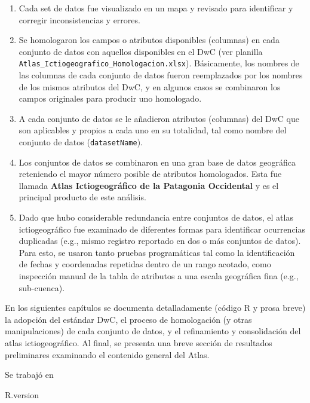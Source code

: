 \documentclass[sn-apa,pdflatex]{sn-jnl}
\newenvironment{Shaded}{\begin{snugshade}}{\end{snugshade}}
\newcommand{\NormalTok}[1]{#1}
\begin{document}
\begin{enumerate}
\def\labelenumi{\arabic{enumi}.}
\item
  Cada set de datos fue visualizado en un mapa y revisado para
  identificar y corregir inconsistencias y errores.
\item
  Se homologaron los campos o atributos disponibles (columnas) en cada
  conjunto de datos con aquellos disponibles en el DwC (ver planilla
  \texttt{Atlas\_Ictiogeografico\_Homologacion.xlsx}). Básicamente, los
  nombres de las columnas de cada conjunto de datos fueron reemplazados
  por los nombres de los mismos atributos del DwC, y en algunos casos se
  combinaron los campos originales para producir uno homologado.
\item
  A cada conjunto de datos se le añadieron atributos (columnas) del DwC
  que son aplicables y propios a cada uno en su totalidad, tal como
  nombre del conjunto de datos (\texttt{datasetName}).
\item
  Los conjuntos de datos se combinaron en una gran base de datos
  geográfica reteniendo el mayor número posible de atributos
  homologados. Esta fue llamada \textbf{Atlas Ictiogeográfico de la
  Patagonia Occidental} y es el principal producto de este análisis.
\item
  Dado que hubo considerable redundancia entre conjuntos de datos, el
  atlas ictiogeográfico fue examinado de diferentes formas para
  identificar ocurrencias duplicadas (e.g., mismo registro reportado en
  dos o más conjuntos de datos). Para esto, se usaron tanto pruebas
  programáticas tal como la identificación de fechas y coordenadas
  repetidas dentro de un rango acotado, como inspección manual de la
  tabla de atributos a una escala geográfica fina (e.g., sub-cuenca).
\end{enumerate}

En los siguientes capítulos se documenta detalladamente (código R y
prosa breve) la adopción del estándar DwC, el proceso de homologación (y
otras manipulaciones) de cada conjunto de datos, y el refinamiento y
consolidación del atlas ictiogeográfico. Al final, se presenta una breve
sección de resultados preliminares examinando el contenido general del
Atlas.

Se trabajó en

\begin{Shaded}
\begin{Highlighting}[]
\NormalTok{R.version}
\end{Highlighting}
\end{Shaded}
\end{document}
